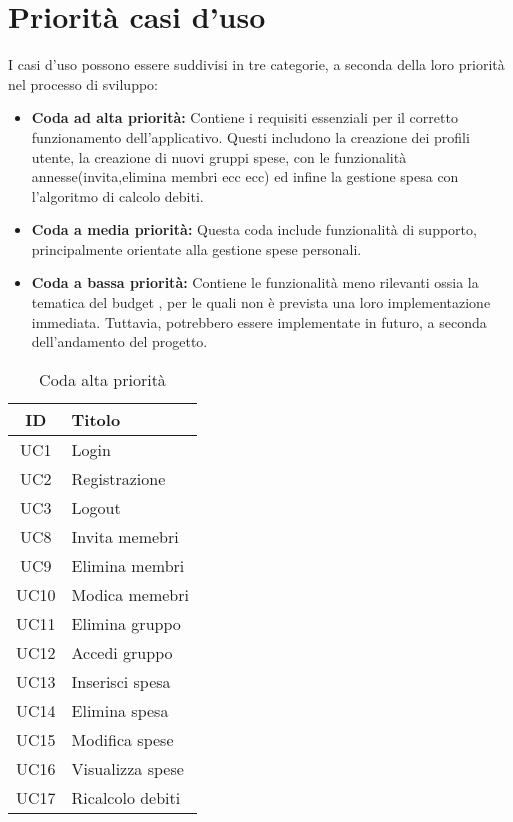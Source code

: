 \section{Priorità casi d'uso}
    I casi d'uso possono essere suddivisi in tre categorie, a seconda della loro priorità nel processo di sviluppo:
    \begin{itemize}
        \item \textbf{Coda ad alta priorità:} 
        Contiene i requisiti essenziali per il corretto funzionamento dell'applicativo. Questi includono la creazione dei profili utente, la creazione di nuovi gruppi spese, con le funzionalità annesse(invita,elimina membri ecc ecc) ed infine la gestione spesa con l'algoritmo di calcolo debiti.
    
        \item \textbf{Coda a media priorità:} 
        Questa coda include funzionalità di supporto, principalmente orientate alla gestione spese personali.
    
        \item \textbf{Coda a bassa priorità:} 
        Contiene le funzionalità meno rilevanti ossia la tematica del budget , per le quali non è prevista una loro implementazione immediata. Tuttavia, potrebbero essere implementate in futuro, a seconda dell'andamento del progetto.
    \end{itemize}

    \begin{table}[h!]
        \centering
        \begin{tabular}{|c|l|}
        \hline
        \textbf{ID} & \textbf{Titolo} \\ \hline
        UC1 & Login\\ \hline
        UC2 & Registrazione \\ \hline
        UC3 & Logout \\ \hline
        UC8 & Invita memebri \\ \hline
        UC9 & Elimina membri \\ \hline
        UC10 & Modica memebri \\ \hline
        UC11 & Elimina gruppo \\ \hline
        UC12 & Accedi gruppo \\ \hline
        UC13 & Inserisci spesa \\ \hline
        UC14 & Elimina spesa \\ \hline
        UC15 & Modifica spese \\ \hline
        UC16 & Visualizza spese \\ \hline
        UC17 & Ricalcolo debiti \\ \hline
        \end{tabular}
        \caption{Coda alta priorità}
    \end{table}


